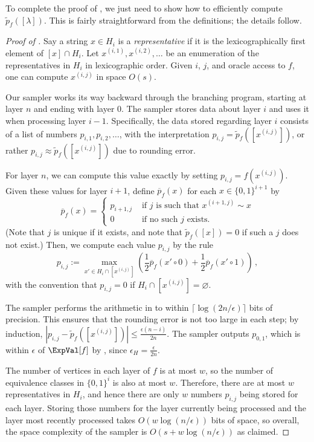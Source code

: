 To complete the proof of , we just need to show how to efficiently compute $\widetilde{p}_f([\lambda])$. This is fairly straightforward from the definitions; the details follow.

\begin{proof}[Proof of ]
Say a string $x \in H_i$ is a \emph{representative} if it is the lexicographically first element of $[x] \cap H_i$. Let $x^{(i, 1)}, x^{(i, 2)}, \dots$ be an enumeration of the representatives in $H_i$ in lexicographic order. Given $i$, $j$, and oracle access to $f$, one can compute $x^{(i, j)}$ in space $O(s)$.

Our sampler works its way backward through the branching program, starting at layer $n$ and ending with layer $0$. The sampler stores data about layer $i$ and uses it when processing layer $i - 1$. Specifically, the data stored regarding layer $i$ consists of a list of numbers $p_{i, 1}, p_{i, 2}, \dots$, with the interpretation $p_{i, j} = \widetilde{p}_f([x^{(i, j)}])$, or rather $p_{i, j} \approx \widetilde{p}_f([x^{(i, j)}])$ due to rounding error.

For layer $n$, we can compute this value exactly by setting $p_{i, j} = f(x^{(i, j)})$. 
Given these values for layer $i + 1$, define $\overline{p}_f(x)$ for each $x \in \{0, 1\}^{i + 1}$ by
\[
\overline{p}_f(x) = \begin{cases}
p_{i + 1, j} & \text{ if $j$ is such that $x^{(i + 1, j)} \sim x$} \\
0 & \text{ if no such $j$ exists.}
\end{cases}
\]
(Note that $j$ is unique if it exists, and note that $\widetilde{p}_f([x]) = 0$ if such a $j$ does not exist.) Then, we compute each value $p_{i, j}$ by the rule
\begin{equation} \label{eqn:pij}
p_{i, j} := \max_{x' \in H_i \cap [x^{(i, j)}]} \left(\frac{1}{2} \overline{p}_f(x' \circ 0) + \frac{1}{2} \overline{p}_f(x' \circ 1)\right)\,,
\end{equation}
with the convention that $p_{i, j} = 0$ if $H_i \cap [x^{(i, j)}] = \varnothing$.

The sampler performs the arithmetic in  to within $\lceil \log(2n/\epsilon)\rceil$ bits of precision. This ensures that the rounding error is not too large in each step; by induction, $|p_{i, j} - \widetilde{p}_f([x^{(i, j)}])| \leq \frac{\epsilon (n - i)}{2n}$. The sampler outputs $p_{0, 1}$, which is within $\epsilon$ of $\ExpVal[f]$ by , since $\epsilon_H = \frac{\epsilon}{2n}$.

The number of vertices in each layer of $f$ is at most $w$, so the number of equivalence classes in $\{0, 1\}^i$ is also at most $w$. Therefore, there are at most $w$ representatives in $H_i$, and hence there are only $w$ numbers $p_{i, j}$ being stored for each layer. Storing those numbers for the layer currently being processed and the layer most recently processed takes $O(w \log(n/\epsilon))$ bits of space, so overall, the space complexity of the sampler is $O(s + w \log(n/\epsilon))$ as claimed.
\end{proof}

